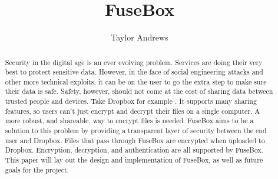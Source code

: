\documentclass[11pt,twocolumn,letterpaper]{article}
\newcommand{\appname}{FuseBox }
\newcommand{\appnameWOspace}{FuseBox}
\begin{document}
\title{\appname}

\author{Taylor Andrews}

\maketitle

\begin{abstract}
Security in the digital age is an ever evolving problem.
Services are doing their very best to protect sensitive data. 
However, in the face of social engineering attacks and other more technical
exploits, it can be on the user to go the extra step to make sure
their data is safe. Safety, however, should not come at the cost of
sharing data between trusted people and devices. Take Dropbox for
example \cite{exampleref1}. It supports many sharing features, so users can't just
encrypt and decrypt their files on a single computer. A more robust,
and shareable, way to encrypt files is needed. 
\appname aims to be a solution to this problem by providing a
transparent layer of security between the end user and Dropbox. Files
that pass through \appname are encrypted when uploaded to Dropbox. 
Encryption, decryption, and authentication are all supported by \appnameWOspace.
This paper will lay out
the design and implementation of \appnameWOspace, as well as 
future goals for the project.    
\end{abstract}
\end{document}
